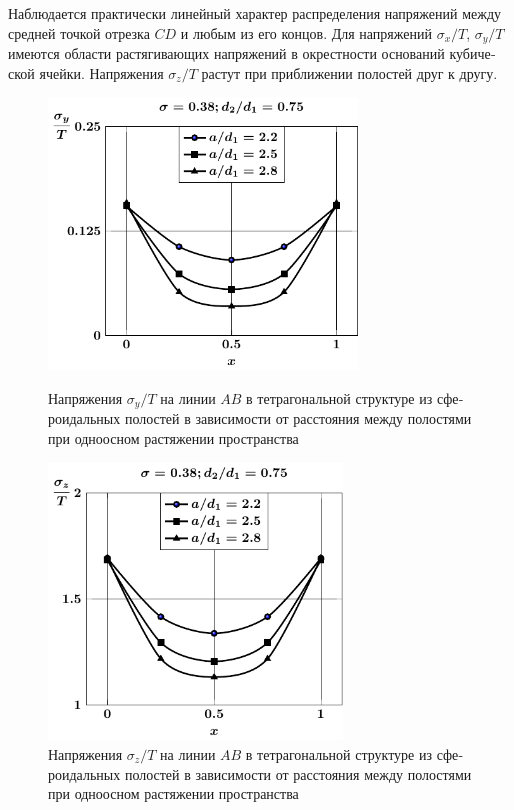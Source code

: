 \begin{russian}
Наблюдается практически линейный характер распределения напряжений между средней точкой отрезка $CD$ и любым из его концов. Для напряжений $\sigma_x/T$, $\sigma_y/T$ имеются области растягивающих напряжений в окрестности оснований кубической ячейки. Напряжения   $\sigma_z/T$ растут при приближении полостей друг к другу.

\begin{figure}[h!]
\centering\footnotesize
\parbox[b]{7.5cm}{\centering\includegraphics[width=8.2cm]{cav8-a-d75-t1-sig_y-ab.pdf}
\caption{Напряжения $\sigma_y/T$ на линии $AB$ в тетрагональной структуре из сфероидальных полостей в зависимости от расстояния между полостями при одноосном растяжении пространства
\label{f:9:31}}}\hfil\hfil
\parbox[b]{7.5cm}{\centering\includegraphics[width=7.8cm]{cav8-a-d75-t1-sig_z-ab.pdf}
\caption{Напряжения $\sigma_z/T$ на линии $AB$ в тетрагональной структуре из сфероидальных полостей в зависимости от расстояния между полостями при одноосном растяжении пространства
\label{f:9:32}}}
\end{figure}


\end{russian}
